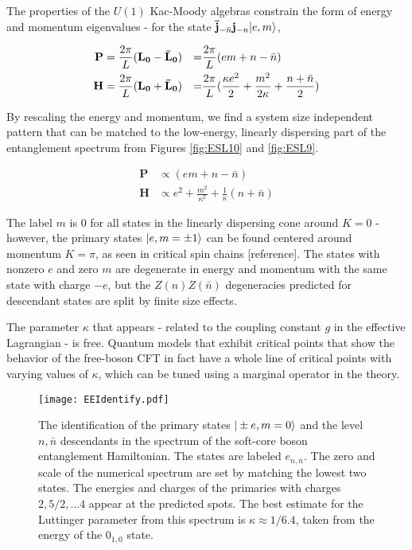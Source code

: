 The properties of the $U(1)$ Kac-Moody algebras constrain the form of 
energy and momentum eigenvalues - for the state 
$\mathbf{\bar{j}}_{-\bar{n}} \mathbf{j}_{-n} \vert e, m \rangle$, 

\begin{align*}
	\mathbf{P} =\frac{2\pi}{L}&(\uL-\bL) 
	&=& \frac{2\pi}{L}(em + n - \bar{n}) \\
	\mathbf{H} = \frac{2\pi}{L}&(\uL+\bL) 
	&=& \frac{2\pi}{L}(\frac{\kappa e^2}{2} + \frac{m^2}{2 \kappa} + \frac{n + \bar{n}}{2}) %
\end{align*}

By rescaling the energy and momentum, we find a system size 
independent pattern that can be matched to the low-energy, linearly 
dispersing part of the entanglement spectrum from Figures 
\ref{fig:ESL10} and \ref{fig:ESL9}. 

\begin{align*}
\mathbf{P} &\propto (em + n - \bar{n}) \\
\mathbf{H} &\propto e^2 + \frac{m^2}{\kappa^2} + \frac{1}{\kappa}(n + \bar{n})
\end{align*}

The label $m$ is 0 for all states in the linearly dispersing cone 
around $K=0$ - however, the primary states $\vert e, m=\pm 1 \rangle$ can be 
found centered around momentum $K=\pi$, as seen in critical spin 
chains [reference]. The states with nonzero $e$ and zero $m$ are 
degenerate in energy and momentum with the same state with charge 
$-e$, but the $Z(n)Z(\bar{n})$ degeneracies predicted for descendant 
states are split by finite size effects.

The parameter $\kappa$ that appears - related to the coupling constant 
$g$ in the effective Lagrangian - is free. Quantum models that exhibit 
critical points that show the behavior of the free-boson CFT in fact 
have a whole line of critical points with varying values of $\kappa$, 
which can be tuned using a marginal operator in the theory.

\begin{figure}[htbc]
	\centering
	\texttt{[image: EEIdentify.pdf]}
	\caption{The identification of the primary states $\vert \pm e, m=0 \rangle$ and the level $n, \bar{n}$ 
	descendants in the spectrum of the soft-core boson entanglement Hamiltonian. The states are labeled 
	$e_{n, \bar{n}}$. The zero and scale of the numerical spectrum are set by matching the lowest two 
	states. The energies and charges of the primaries with charges $2, 5/2, ... 4$ appear at the predicted 
	spots.  The best estimate for the Luttinger parameter from this spectrum is $\kappa \approx 1/6.4$, 
	taken from the energy of the $0_{1, 0}$ state. }
	\label{fig:EEIdentify}
\end{figure}

